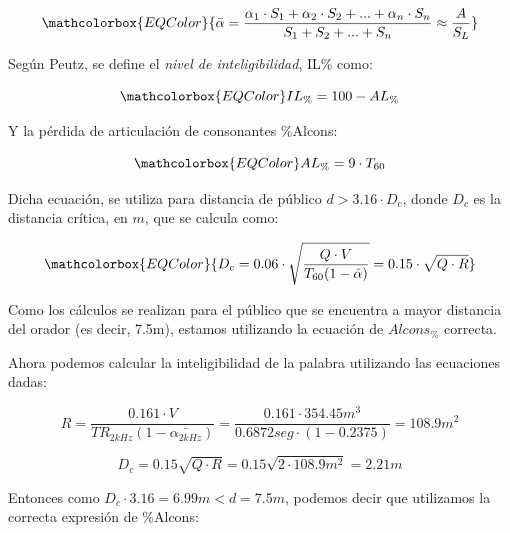 \begin{equation}
   \mathcolorbox{EQColor}{ \bar{\alpha} = \frac{\alpha_1 \cdot S_1 + \alpha_2 \cdot S_2 + ... + \alpha_n \cdot S_n}{S_1 +S_2 + ...+ S_n} \approx \frac{A}{S_L} }
\end{equation}

\par Según Peutz, se define el \textit{nivel de inteligibilidad}, IL\% como:

\begin{equation}
   \mathcolorbox{EQColor}{ IL_{\%} = 100 - AL_{\%} }
\end{equation}

\par Y la pérdida de articulación de consonantes \%Alcons:

\begin{equation}
    \mathcolorbox{EQColor}{ AL_{\%} = 9 \cdot T_{60} }
    \label{eq:calculoAlcons}
\end{equation}

\par Dicha ecuación, se utiliza para distancia de público $d>3.16\cdot D_c$, donde $D_c$ es la distancia crítica, en $m$, que se calcula como:

\begin{equation}
   \mathcolorbox{EQColor}{ D_c = 0.06 \cdot \sqrt{\frac{Q \cdot V}{T_{60} (1- \hat{\alpha})}} = 0.15 \cdot \sqrt{Q\cdot R} }
\end{equation}

\par Como los cálculos se realizan para el público que se encuentra a mayor distancia del orador (es decir, 7.5m), estamos utilizando la ecuación de $Alcons_{\%}$ correcta.\\

\par Ahora podemos calcular la inteligibilidad de la palabra utilizando las ecuaciones dadas:

\begin{equation*}
        R  = \frac{0.161 \cdot V}{TR_{2kHz} (1- \bar{\alpha_{2kHz}})} =  \frac{0.161 \cdot 354.45 m^3}{0.6872 seg \cdot (1- 0.2375)} =108.9 m^2
\end{equation*}

\begin{equation*}
        D_c = 0.15 \sqrt{Q\cdot R} = 0.15 \sqrt{ 2\cdot 108.9 m^2} =  2.21m
\end{equation*}

\par Entonces como $D_c \cdot3.16 = 6.99m < d = 7.5m$, podemos decir que utilizamos la correcta expresión de \%Alcons:

